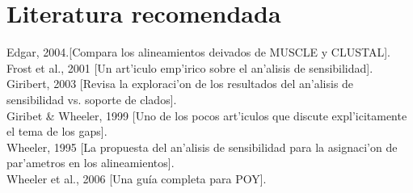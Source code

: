 \section{Literatura recomendada}
\noindent
Edgar, 2004.[Compara los alineamientos deivados de MUSCLE y CLUSTAL].\\
Frost et al., 2001 [Un art'iculo emp'irico sobre el an'alisis de sensibilidad].\\
Giribert, 2003 [Revisa la exploraci'on de los resultados del an'alisis de sensibilidad vs. soporte de clados].\\
Giribet \& Wheeler, 1999 [Uno de los pocos art'iculos que discute expl'icitamente el tema de los gaps].\\
Wheeler, 1995 [La propuesta del an'alisis de sensibilidad para la asignaci'on de par'ametros en los alineamientos].\\
Wheeler et al., 2006 [Una gu\'ia completa para POY].